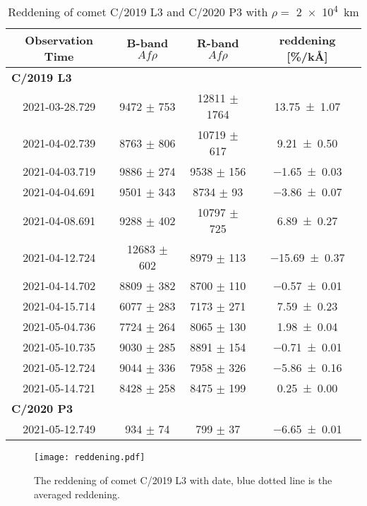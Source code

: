\begin{table}
    \centering
    \caption{Reddening of comet C/2019 L3 and C/2020 P3 with $\rho = $ \SI{2e4}{\km} }\label{tab:reddening}
    \begin{threeparttable}
        \begin{tabular}{cccc}
            \toprule
            Observation Time & B-band $Af\rho$ & R-band $Af\rho$ & reddening [\si{\%/\kilo\angstrom}]\\
            \midrule
            \multicolumn{4}{l}{\textbf{C/2019 L3}} \\
            2021-03-28.729 & 9472 $\pm$ 753 & 12811 $\pm$ 1764 & \num{13.75 +- 1.07}\\
            2021-04-02.739 & 8763 $\pm$ 806 & 10719 $\pm$ 617 & \num{9.21 +- 0.50}\\
            2021-04-03.719 & 9886 $\pm$ 274 & 9538 $\pm$ 156 & \num{-1.65 +- 0.03}\\
            2021-04-04.691 & 9501 $\pm$ 343 & 8734 $\pm$ 93 & \num{-3.86 +- 0.07}\\
            2021-04-08.691 & 9288 $\pm$ 402 & 10797 $\pm$ 725 & \num{6.89 +- 0.27}\\
            2021-04-12.724 & 12683 $\pm$ 602 & 8979 $\pm$ 113 & \num{-15.69 +- 0.37}\\
            2021-04-14.702 & 8809 $\pm$ 382 & 8700 $\pm$ 110 & \num{-0.57 +- 0.01}\\
            2021-04-15.714 & 6077 $\pm$ 283 & 7173 $\pm$ 271 & \num{7.59 +- 0.23}\\
            2021-05-04.736 & 7724 $\pm$ 264 & 8065 $\pm$ 130 & \num{1.98 +- 0.04}\\
            2021-05-10.735 & 9030 $\pm$ 285 & 8891 $\pm$ 154 & \num{-0.71 +- 0.01}\\
            2021-05-12.724 & 9044 $\pm$ 336 & 7958 $\pm$ 326 & \num{-5.86 +- 0.16}\\
            2021-05-14.721 & 8428 $\pm$ 258 & 8475 $\pm$ 199 & \num{0.25 +- 0.00}\\
            \multicolumn{4}{l}{\textbf{C/2020 P3}} \\
            2021-05-12.749 & 934 $\pm$ 74 & 799 $\pm$ 37 & \num{-6.65 +- 0.01}\\
            \bottomrule
        \end{tabular}
    \end{threeparttable}
\end{table}

\begin{figure}
    \centering
    \texttt{[image: reddening.pdf]}
    \caption{The reddening of comet C/2019 L3 with date, blue dotted line is the averaged reddening. }\label{fig:reddening}
\end{figure}
